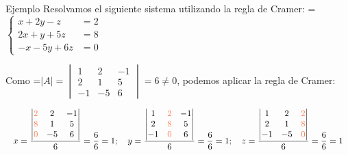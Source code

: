 \documentclass[11pt,a4paper]{article}
\newcommand{\fmm}[1]{\setbox0=\hbox{$#1$}\ifdim\wd0>\linewidth\fmdisp{#1}\else\mbox{\box0}\fi}
\newcommand{\fmdisp}[1]{\[\setbox2=\hbox{$\displaystyle #1$}\ifdim\wd2>\linewidth\resizebox{\linewidth}{!}{\box2}\else\box2\fi\]}
\begin{document}
\begin{fmex}{Ejemplo}
Resolvamos el siguiente sistema utilizando la regla de Cramer: \fmm{\left\{\begin{aligned}x+2y-z&=2\\ 2x+y+5z&=8\\ -x-5y+6z&=0\end{aligned}\right.}

Como \fmm{|A|=\begin{vmatrix}1 & 2 & -1\\ 2 & 1 & 5\\ -1 & -5 & 6\end{vmatrix}=6\neq0}, podemos aplicar la regla de Cramer:

\fmdisp{x=\frac{\begin{vmatrix}\color[HTML]{ff7a50}2 & 2 & -1\\ \color[HTML]{ff7a50}8 & 1 & 5\\ \color[HTML]{ff7a50}0 & -5 & 6\end{vmatrix}}{6}=\frac{6}{6}=1;\quad y=\frac{\begin{vmatrix}1 & \color[HTML]{ff7a50}2 & -1\\ 2 & \color[HTML]{ff7a50}8 & 5\\ -1 & \color[HTML]{ff7a50}0 & 6\end{vmatrix}}{6}=\frac{6}{6}=1;\quad z=\frac{\begin{vmatrix}1 & 2 & \color[HTML]{ff7a50}2\\ 2 & 1 & \color[HTML]{ff7a50}8\\ -1 & -5 & \color[HTML]{ff7a50}0\end{vmatrix}}{6}=\frac{6}{6}=1}

\end{fmex}
\end{document}
